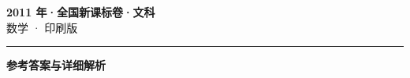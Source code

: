 \documentclass[zihao=5, a4paper]{ctexart}
\begin{document}
\begin{center}
  {\Large\bfseries 2011 年·全国新课标卷·文科}\\[4pt]
  {\large 数学 · 印刷版}
\end{center}
\medskip
{}

\par\bigskip\hrule\bigskip
{}
\begin{center}{\large\bfseries 参考答案与详细解析}\end{center}
\smallskip

\end{document}
